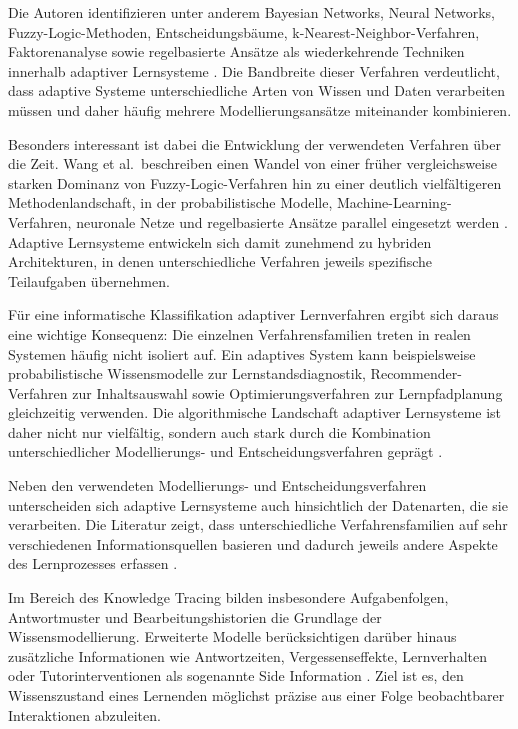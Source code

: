Die Autoren identifizieren unter anderem Bayesian Networks, Neural
Networks, Fuzzy-Logic-Methoden, Entscheidungsbäume,
k-Nearest-Neighbor-Verfahren, Faktorenanalyse sowie regelbasierte
Ansätze als wiederkehrende Techniken innerhalb adaptiver Lernsysteme
\citep{Wang2025}. Die Bandbreite dieser Verfahren verdeutlicht, dass
adaptive Systeme unterschiedliche Arten von Wissen und Daten verarbeiten
müssen und daher häufig mehrere Modellierungsansätze miteinander
kombinieren.

Besonders interessant ist dabei die Entwicklung der verwendeten
Verfahren über die Zeit. Wang et al.~beschreiben einen Wandel von einer
früher vergleichsweise starken Dominanz von Fuzzy-Logic-Verfahren hin zu
einer deutlich vielfältigeren Methodenlandschaft, in der
probabilistische Modelle, Machine-Learning-Verfahren, neuronale Netze
und regelbasierte Ansätze parallel eingesetzt werden \citep{Wang2025}.
Adaptive Lernsysteme entwickeln sich damit zunehmend zu hybriden
Architekturen, in denen unterschiedliche Verfahren jeweils spezifische
Teilaufgaben übernehmen.

Für eine informatische Klassifikation adaptiver Lernverfahren ergibt
sich daraus eine wichtige Konsequenz: Die einzelnen Verfahrensfamilien
treten in realen Systemen häufig nicht isoliert auf. Ein adaptives
System kann beispielsweise probabilistische Wissensmodelle zur
Lernstandsdiagnostik, Recommender-Verfahren zur Inhaltsauswahl sowie
Optimierungsverfahren zur Lernpfadplanung gleichzeitig verwenden. Die
algorithmische Landschaft adaptiver Lernsysteme ist daher nicht nur
vielfältig, sondern auch stark durch die Kombination unterschiedlicher
Modellierungs- und Entscheidungsverfahren geprägt \citep{Wang2025}.

Neben den verwendeten Modellierungs- und Entscheidungsverfahren
unterscheiden sich adaptive Lernsysteme auch hinsichtlich der
Datenarten, die sie verarbeiten. Die Literatur zeigt, dass
unterschiedliche Verfahrensfamilien auf sehr verschiedenen
Informationsquellen basieren und dadurch jeweils andere Aspekte des
Lernprozesses erfassen \citep{Wang2025, Shen2024, daSilva2023}.

Im Bereich des Knowledge Tracing bilden insbesondere Aufgabenfolgen,
Antwortmuster und Bearbeitungshistorien die Grundlage der
Wissensmodellierung. Erweiterte Modelle berücksichtigen darüber hinaus
zusätzliche Informationen wie Antwortzeiten, Vergessenseffekte,
Lernverhalten oder Tutorinterventionen als sogenannte Side Information
\citep{Shen2024}. Ziel ist es, den Wissenszustand eines Lernenden
möglichst präzise aus einer Folge beobachtbarer Interaktionen
abzuleiten.

